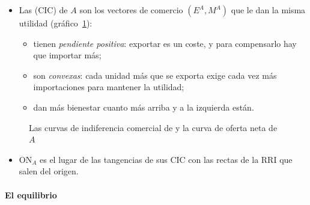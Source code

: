 \documentclass[11pt]{article}
\begin{document}
\begin{itemize}
\item Las  (CIC) de $A$\nocite{Meade1952Geometry} son los vectores de comercio $(E^A,M^A)$ que le dan la misma utilidad (gráfico~\ref{fig:anexo-meade}):
  \begin{itemize}
  \item tienen \emph{pendiente positiva}: exportar es un coste, y para compensarlo hay que importar más;
  \item son \emph{convexas}: cada unidad más que se exporta exige cada vez más importaciones para mantener la utilidad;
  \item dan más bienestar cuanto más arriba y a la izquierda están.
  \end{itemize}
\end{itemize}
\begin{figure}[H]
\centering
\caption{Las curvas de indiferencia comercial de  y la curva de oferta neta de $A$}\label{fig:anexo-meade}
\end{figure}
\begin{itemize}
\item ON$_A$ es el lugar de las tangencias de sus CIC con las rectas de la RRI que salen del origen.
\end{itemize}

\paragraph{El equilibrio}
\end{document}
